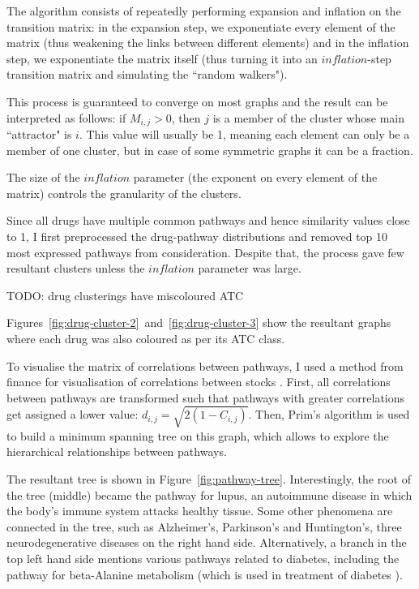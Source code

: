 \documentclass[12pt,a4paper,twoside,openright]{report}
\begin{document}


The algorithm consists of repeatedly performing expansion and inflation on the transition matrix: in the expansion step, we exponentiate every element of the matrix (thus weakening the links between different elements) and in the inflation step, we exponentiate the matrix itself (thus turning it into an $\mathit{inflation}$-step transition matrix and simulating the ``random walkers").

This process is guaranteed to converge on most graphs and the result can be interpreted as follows: if $M_{i,j} > 0$, then $j$ is a member of the cluster whose main ``attractor" is $i$. This value will usually be 1, meaning each element can only be a member of one cluster, but in case of some symmetric graphs it can be a fraction.

The size of the $\mathit{inflation}$ parameter (the exponent on every element of the matrix) controls the granularity of the clusters.

Since all drugs have multiple common pathways and hence similarity values close to 1, I first preprocessed the drug-pathway distributions and removed top 10 most expressed pathways from consideration. Despite that, the process gave few resultant clusters unless the $\mathit{inflation}$ parameter was large.

TODO: drug clusterings have miscoloured ATC

Figures~\ref{fig:drug-cluster-2}~and~\ref{fig:drug-cluster-3} show the resultant graphs where each drug was also coloured as per its ATC class.

To visualise the matrix of correlations between pathways, I used a method from finance for visualisation of correlations between stocks \cite{doi:10.1007/s100510050929}. First, all correlations between pathways are transformed such that pathways with greater correlations get assigned a lower value: $d_{i,j} = \sqrt{2(1 - C_{i, j})}$. Then, Prim's algorithm \cite{doi:10.1007/BF01386390} is used to build a minimum spanning tree on this graph, which allows to explore the hierarchical relationships between pathways.

The resultant tree is shown in Figure~\ref{fig:pathway-tree}. Interestingly, the root of the tree (middle) became the pathway for lupus, an autoimmune disease in which the body's immune system attacks healthy tissue. Some other phenomena are connected in the tree, such as Alzheimer's, Parkinson's and Huntington's, three neurodegenerative diseases on the right hand side. Alternatively, a branch in the top left hand side mentions various pathways related to diabetes, including the pathway for beta-Alanine metabolism (which is used in treatment of diabetes \cite{buckley1996glp}).
\end{document}
